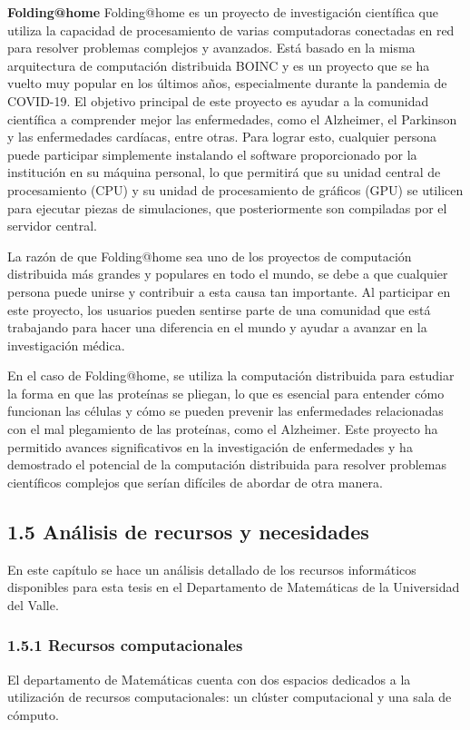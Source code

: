 \begin{spacing}{1.5}
\begin{multicols}{2}
  \textbf{Folding@home}
  \newline
  Folding@home es un proyecto de investigación científica que utiliza la capacidad de procesamiento de varias computadoras conectadas en red para resolver problemas complejos y avanzados. Está basado en la misma arquitectura de computación distribuida BOINC y es un proyecto que se ha vuelto muy popular en los últimos años, especialmente durante la pandemia de COVID-19. El objetivo principal de este proyecto es ayudar a la comunidad científica a comprender mejor las enfermedades, como el Alzheimer, el Parkinson y las enfermedades cardíacas, entre otras. Para lograr esto, cualquier persona puede participar simplemente instalando el software proporcionado por la institución en su máquina personal, lo que permitirá que su unidad central de procesamiento (CPU) y su unidad de procesamiento de gráficos (GPU) se utilicen para ejecutar piezas de simulaciones, que posteriormente son compiladas por el servidor central.

  La razón de que Folding@home sea uno de los proyectos de computación distribuida más grandes y populares en todo el mundo, se debe a que cualquier persona puede unirse y contribuir a esta causa tan importante. Al participar en este proyecto, los usuarios pueden sentirse parte de una comunidad que está trabajando para hacer una diferencia en el mundo y ayudar a avanzar en la investigación médica.

  En el caso de Folding@home, se utiliza la computación distribuida para estudiar la forma en que las proteínas se pliegan, lo que es esencial para entender cómo funcionan las células y cómo se pueden prevenir las enfermedades relacionadas con el mal plegamiento de las proteínas, como el Alzheimer. Este proyecto ha permitido avances significativos en la investigación de enfermedades y ha demostrado el potencial de la computación distribuida para resolver problemas científicos complejos que serían difíciles de abordar de otra manera. \cite{Folding@home-1}\subsection{1.5 Análisis de recursos y necesidades}
  En este capítulo se hace un análisis detallado de los recursos informáticos disponibles para esta tesis en el Departamento de Matemáticas de la Universidad del Valle.

  \subsubsection{1.5.1 Recursos computacionales}
  El departamento de Matemáticas cuenta con dos espacios dedicados a la utilización de recursos computacionales: un clúster computacional y una sala de cómputo.


\end{multicols}
\end{spacing}
